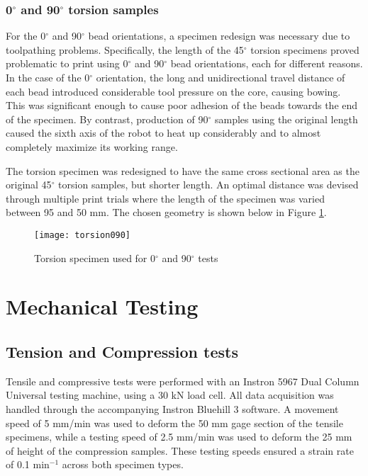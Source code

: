 \documentclass[main.tex]{subfiles}
\begin{document}
\subsubsection{0$^\circ$ and 90$^\circ$ torsion samples}
For the 0$^\circ$ and 90$^\circ$ bead orientations, a specimen redesign was necessary due to toolpathing problems. Specifically, the length of the 45$^\circ$ torsion specimens proved problematic to print using 0$^\circ$ and 90$^\circ$ bead orientations, each for different reasons. In the case of the 0$^\circ$ orientation, the long and unidirectional travel distance of each bead introduced considerable tool pressure on the core, causing bowing. This was significant enough to cause poor adhesion of the beads towards the end of the specimen. By contrast, production of 90$^\circ$ samples using the original length caused the sixth axis of the robot to heat up considerably and to almost completely maximize its working range. 

The torsion specimen was redesigned to have the same cross sectional area as the original 45$^\circ$ torsion samples, but shorter length. An optimal distance was devised through multiple print trials where the length of the specimen was varied between 95 and 50 mm. The chosen geometry is shown below in Figure \ref{fig:tors090}.

\begin{figure}[h]
	\center
	\texttt{[image: torsion090]}
	\caption{Torsion specimen used for 0$^\circ$ and 90$^\circ$ tests} \label{fig:tors090}
\end{figure}

\section{Mechanical Testing}

\subsection{Tension and Compression tests}
Tensile and compressive tests were performed with an Instron 5967 Dual Column Universal testing machine, using a 30 kN load cell. All data acquisition was handled through the accompanying Instron Bluehill 3 software. A movement speed of 5 mm/min was used to deform the 50 mm gage section of the tensile specimens, while a testing speed of 2.5 mm/min was used to deform the 25 mm of height of the compression samples. These testing speeds ensured a strain rate of 0.1 min$^{-1}$ across both specimen types.
\end{document}
